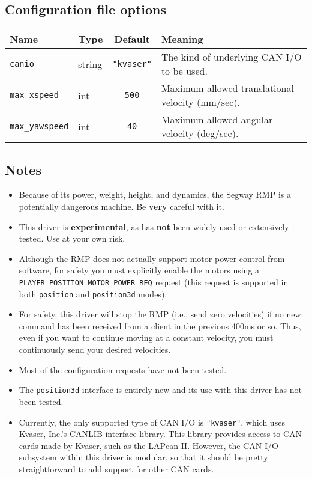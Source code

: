 \subsection*{Configuration file options}

\begin{center}
{\small \begin{tabular}{|l|l|c|l|}
\hline
Name & Type & Default & Meaning\\
\hline
{\tt canio} & string & {\tt "kvaser"} & The kind of underlying CAN I/O to
be used.\\

{\tt max\_xspeed} & int & {\tt 500} & Maximum allowed translational velocity
(mm/sec).\\

{\tt max\_yawspeed} & int & {\tt 40} & Maximum allowed angular velocity
(deg/sec).\\
\hline
\end{tabular}}
\end{center}

\subsection*{Notes}
\begin{itemize}
\item Because of its power, weight, height, and dynamics, the Segway RMP is
a potentially dangerous machine.  Be {\bf very} careful with it.
\item This driver is {\bf experimental}, as has {\bf not} been widely used
or extensively tested.  Use at your own risk.
\item Although the RMP does not actually support motor power control from 
software, for safety you must explicitly enable the motors using a
{\tt PLAYER\_POSITION\_MOTOR\_POWER\_REQ} request (this request is supported in
both {\tt position} and {\tt position3d} modes).
\item For safety, this driver will stop the RMP (i.e., send zero velocities)
if no new command has been received from a client in the previous 400ms or so.
Thus, even if you want to continue moving at a constant velocity, you must
continuously send your desired velocities.
\item Most of the configuration requests have not been tested.
\item The {\tt position3d} interface is entirely new and its use with this
driver has not been tested.
\item Currently, the only supported type of CAN I/O is {\tt "kvaser"},
which uses Kvaser, Inc.'s CANLIB interface library.  This library provides
access to CAN cards made by Kvaser, such as the LAPcan II.  However, the CAN 
I/O subsystem within this driver is modular, so that it should be pretty
straightforward to add support for other CAN cards.
\end{itemize}
